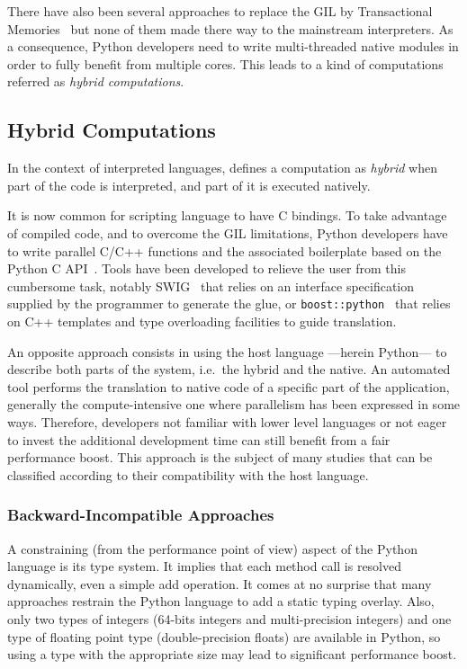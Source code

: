\documentclass[conference]{IEEEtran}
\begin{document}
There have also been several approaches to replace the GIL by Transactional
Memories~\cite{Riley2006,Tabba2010} but none of them made there way to the
mainstream interpreters. As a consequence, Python developers need to write
multi-threaded native modules in order to fully benefit from multiple cores.
This leads to a kind of computations referred as \emph{hybrid computations}.


\subsection{Hybrid Computations}

In the context of interpreted languages, \cite{dongara2007} defines a
computation as \emph{hybrid} when part of the code is interpreted, and part of
it is executed natively.

It is now common for scripting language to have C bindings. To take advantage of
compiled code, and to overcome the GIL limitations, Python developers have to
write parallel C/C++ functions and the associated boilerplate based on the
Python C API~\cite{pythoncapi}. Tools have been developed to relieve the user
from this cumbersome task, notably SWIG~\cite{swig2003} that relies on an
interface specification supplied by the programmer to generate the glue, or
\texttt{boost::python}~\cite{boostpython2007} that relies on C++ templates and
type overloading facilities to guide translation.

An opposite approach consists in using the host language ---herein Python--- to
describe both parts of the system, i.e.\ the hybrid and the native. An automated
tool performs the translation to native code of a specific part of the
application, generally the compute-intensive one where parallelism has been
expressed in some ways.
Therefore, developers not familiar with lower level languages or not eager to
invest the additional development time can still benefit from a fair performance
boost.
This approach is the subject of many studies that can be classified according to
their compatibility with the host language.

\subsubsection{Backward-Incompatible Approaches}

A constraining (from the performance point of view) aspect of the Python
language is its type system. It implies that each method call is resolved
dynamically, even a simple add operation. It comes at no surprise that many
approaches restrain the Python language to add a static typing overlay.  Also,
only two types of integers (64-bits integers and multi-precision integers) and
one type of floating point type (double-precision floats) are available in
Python, so using a type with the appropriate size may lead to significant
performance boost.
\end{document}
